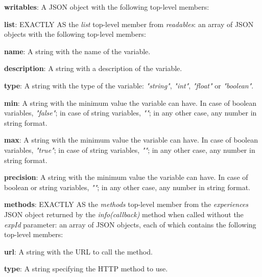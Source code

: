 \begin{myEnumerate}
\begin{myEnumerate}
\begin{myEnumerate}
\begin{myEnumerate}
\begin{myEnumerate}
                    \end{myEnumerate}
            \end{myEnumerate}
        \end{myEnumerate}
    \end{myEnumerate}
    \item \textbf{writables}: A JSON object with the following top-level members:
    \begin{myEnumerate}
        \item \textbf{list}: EXACTLY AS the \textit{list} top-level member from \textit{readables}: an array of JSON objects with the following top-level members:
        \begin{myEnumerate}
            \item \textbf{name}: A string with the name of the variable.
            \item \textbf{description}: A string with a description of the variable.
            \item \textbf{type}: A string with the type of the variable: \textit{"string"}, \textit{"int"}, \textit{"float"} or \textit{"boolean"}.
            \item \textbf{min}: A string with the minimum value the variable can have. In case of boolean variables, \textit{"false"}; in case of string variables, \textit{""}; in any other case, any number in string format.
            \item \textbf{max}: A string with the minimum value the variable can have. In case of boolean variables, \textit{"true"}; in case of string variables, \textit{""}; in any other case, any number in string format.
            \item \textbf{precision}: A string with the minimum value the variable can have. In case of boolean or string variables, \textit{""}; in any other case, any number in string format.
        \end{myEnumerate}
        \item \textbf{methods}: EXACTLY AS the \textit{methods} top-level member from the \textit{experiences} JSON object returned by the \textit{info(callback)} method when called without the \textit{expId} parameter: an array of JSON objects, each of which contains the following top-level members:
        \begin{myEnumerate}
            \item \textbf{url}: A string with the URL to call the method.
            \item \textbf{type}: A string specifying the HTTP method to use.

\end{myEnumerate}
\end{myEnumerate}
\end{myEnumerate}
